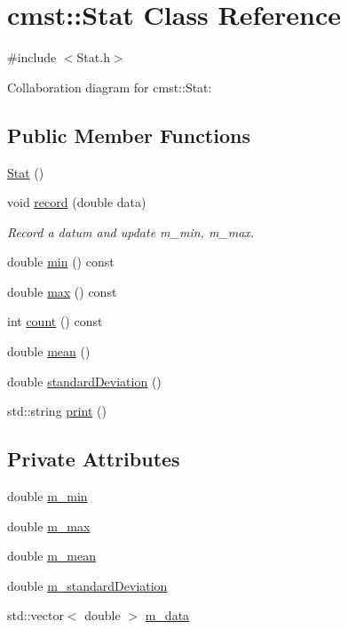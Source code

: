 \hypertarget{classcmst_1_1_stat}{}\section{cmst\+:\+:Stat Class Reference}
\label{classcmst_1_1_stat}


{\ttfamily \#include $<$Stat.\+h$>$}



Collaboration diagram for cmst\+:\+:Stat\+:
\subsection*{Public Member Functions}
\begin{DoxyCompactItemize}
\item 
\hyperlink{classcmst_1_1_stat_a1f07a880a815c7efe4e4d244fb0c6b7d}{Stat} ()
\item 
void \hyperlink{classcmst_1_1_stat_ab1e2fe7c367da505a6b5f1fb5eb619d2}{record} (double data)
\begin{DoxyCompactList}\small\item\em Record a datum and update m\+\_\+min, m\+\_\+max. \end{DoxyCompactList}\item 
double \hyperlink{classcmst_1_1_stat_a1a6a92dee526145fb289d79a94afe3ae}{min} () const 
\item 
double \hyperlink{classcmst_1_1_stat_ab42898f6611aa9f1ad028f99c3d4242a}{max} () const 
\item 
int \hyperlink{classcmst_1_1_stat_ab8c6707fa4739fda8b27a2481df25c35}{count} () const 
\item 
double \hyperlink{classcmst_1_1_stat_aa40d8d516e7f866146d91866d63faf2b}{mean} ()
\item 
double \hyperlink{classcmst_1_1_stat_abfbaefc3a4174643a2eb282251fd86a5}{standard\+Deviation} ()
\item 
std\+::string \hyperlink{classcmst_1_1_stat_a03d1a0f52e2ea72cfab11a426726aea4}{print} ()
\end{DoxyCompactItemize}
\subsection*{Private Attributes}
\begin{DoxyCompactItemize}
\item 
double \hyperlink{classcmst_1_1_stat_a2f503d58c0bc9eed8bd6d2c46edffbf4}{m\+\_\+min}
\item 
double \hyperlink{classcmst_1_1_stat_a93f52caf45b449d34c87fcbb0ebaa93e}{m\+\_\+max}
\item 
double \hyperlink{classcmst_1_1_stat_a0fc650572d2cea2bae2190188f3a03cf}{m\+\_\+mean}
\item 
double \hyperlink{classcmst_1_1_stat_aa6321c420c546603588be13de4628957}{m\+\_\+standard\+Deviation}
\item 
std\+::vector$<$ double $>$ \hyperlink{classcmst_1_1_stat_a8c6fad792b12d961df5ea2b091cb39f4}{m\+\_\+data}
\end{DoxyCompactItemize}


